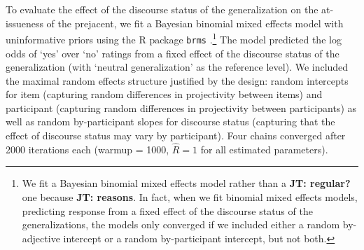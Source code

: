 \documentclass[11pt,fleqn]{article}
\newcommand{\6}{\mbox{$[\hspace*{-.6mm}[$}}
\newcommand{\9}{\mbox{$]\hspace*{-.6mm}]$}}
\newcommand{\jt}[1]{\textbf{\color{blue}JT: #1}}
\begin{document}
To evaluate the effect of the discourse status of the generalization on the at-issueness of the prejacent, we fit a Bayesian binomial mixed effects model with uninformative priors using the R package \verb|brms| \citep{buerkner2017}.\footnote{We fit a Bayesian binomial mixed effects model rather than a \jt{regular?} one because \jt{reasons}. In fact, when we fit binomial mixed effects models, predicting response from a fixed effect of the discourse status of the generalizations, the models only converged if we included either a random by-adjective intercept or a random by-participant intercept, but not both. } The model predicted the log odds of `yes' over `no' ratings from a fixed effect of the discourse status of the generalization (with `neutral generalization' as the reference level). We included the maximal random effects structure justified by the design: random intercepts for item (capturing random differences in projectivity between items) and participant (capturing random differences in projectivity between participants) as well as random by-participant slopes for discourse status (capturing that the effect of discourse status may vary by participant). Four chains converged after 2000 iterations each (warmup = 1000, \(\hat{R}=1\) for all estimated parameters).
\end{document}
